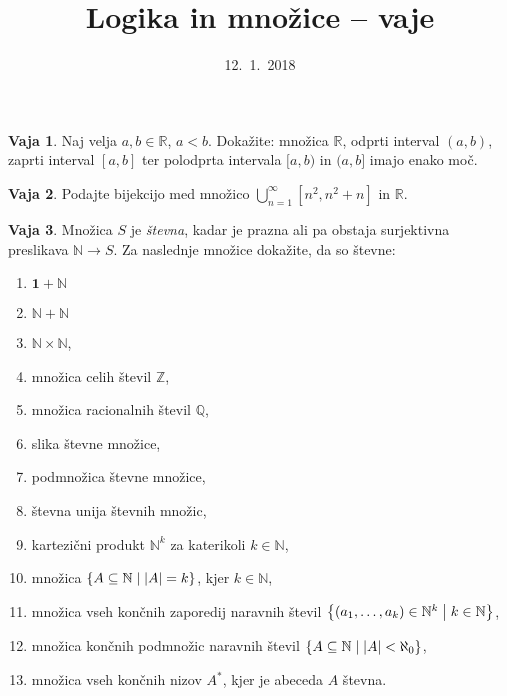 \documentclass{article}
\newcommand{\NN}{\mathbb{N}}
\newcommand{\ZZ}{\mathbb{Z}}
\newcommand{\QQ}{\mathbb{Q}}
\newcommand{\RR}{\mathbb{R}}
\newcommand{\one}{\mathtt{\mathbf{1}}}
\theoremstyle{definition}
\newtheorem{vaja}{Vaja}
\begin{document}
\title{Logika in množice -- vaje}
\date{12.~1.~2018}
\maketitle

\begin{vaja}
  Naj velja $a, b \in \RR$, $a < b$. Dokažite: množica $\RR$, odprti interval $(a,b)$, zaprti interval $[a,b]$ ter polodprta intervala $[a,b)$ in $(a,b]$ imajo enako moč.
\end{vaja}

\begin{vaja}
  Podajte bijekcijo med množico $\bigcup_{n = 1}^{\infty} [n^2, n^2 + n]$ in $\mathbb{R}$.
\end{vaja}

\begin{vaja}
  Množica $S$ je \emph{števna}, kadar je prazna ali pa obstaja surjektivna preslikava $\NN \to S$. Za naslednje množice dokažite, da so števne:
  \begin{enumerate}
    \item
      $\one + \NN$
    \item
      $\NN + \NN$
    \item
      $\NN \times \NN$,
    \item
      množica celih števil $\ZZ$,
    \item
      množica racionalnih števil $\QQ$,
    \item
      slika števne množice,
    \item
      podmnožica števne množice,
    \item
      števna unija števnih množic,
    \item
      kartezični produkt $\NN^k$ za katerikoli $k \in \NN$,
    \item
      množica $\set{A \subseteq \NN}{|A| = k}$, kjer $k \in \NN$,
    \item
      množica vseh končnih zaporedij naravnih števil $\set{(a_1, \ldots, a_k) \in \NN^k}{k \in \NN}$,
    \item
      množica končnih podmnožic naravnih števil $\set{A \subseteq \NN}{|A| < \aleph_0}$,
    \item
      množica vseh končnih nizov $A^*$, kjer je abeceda $A$ števna.
  \end{enumerate}
\end{vaja}
\end{document}
